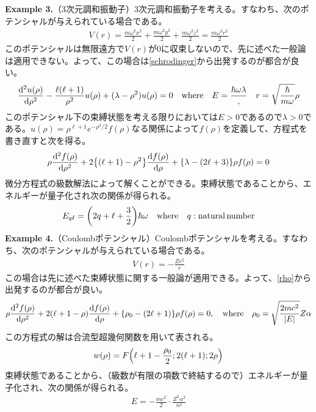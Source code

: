 \documentclass[dvipdfmx]{jarticle}
\theoremstyle{plain}
\begin{document}
\begin{enumerate}
    \textbf{Example 3.}（3次元調和振動子）3次元調和振動子を考える。すなわち、次のポテンシャルが与えられている場合である。
    \begin{align}
      V(r) = \frac{m\omega^2x^2}{2} + \frac{m\omega^2y^2}{2} + \frac{m\omega^2z^2}{2} = \frac{m\omega^2r^2}{2}
    \end{align}
    このポテンシャルは無限遠方で$V(r)$が0に収束しないので、先に述べた一般論は適用できない。よって、この場合は\eqref{schrodinger}から出発するのが都合が良い。
    \begin{align}
      \dv[2]{u(\rho)}{\rho} - \frac{\ell(\ell+1)}{\rho^2}u(\rho) + (\lambda - \rho^2)u(\rho) = 0 \quad \mathrm{where} \quad E = \frac{\hbar \omega \lambda}, \quad r = \sqrt{\frac{\hbar}{m\omega}}\rho
    \end{align}
    このポテンシャル下の束縛状態を考える限りにおいては$E > 0$であるので$\lambda > 0$である。$u(\rho) = \rho^{\ell + 1}e^{-\rho^2/2}f(\rho)$なる関係によって$f(\rho)$を定義して、方程式を書き直すと次を得る。
    \begin{align}
      \rho\dv[2]{f(\rho)}{\rho} + 2\qty{(\ell + 1) - \rho^2}\dv{f(\rho)}{\rho} + \qty{\lambda - (2\ell + 3)}\rho f(\rho) = 0
    \end{align}
    微分方程式の級数解法によって解くことができる。束縛状態であることから、エネルギーが量子化され次の関係が得られる。
    \begin{align}
      E_{q\ell} = \qty(2q + \ell + \frac{3}{2})\hbar\omega \quad \mathrm{where} \quad  q: \mathrm{natural\,number}
    \end{align}
    \textbf{Example 4.}（Coulombポテンシャル）Coulombポテンシャルを考える。すなわち、次のポテンシャルが与えられている場合である。
    \begin{align}
      V(r) = - \frac{Ze^2}{r}
    \end{align}
    この場合は先に述べた束縛状態に関する一般論が適用できる。よって、\eqref{rho}から出発するのが都合が良い。
    \begin{align}
      \rho\dv[2]{f(\rho)}{\rho} + 2\qty(\ell + 1 - \rho)\dv{f(\rho)}{\rho} + \qty{\rho_0 - (2\ell + 1)}\rho f(\rho) = 0, \quad \mathrm{where} \quad \rho_0 = \sqrt{\frac{2mc^2}{\qty|E|}}Z\alpha
    \end{align}
    この方程式の解は合流型超幾何関数を用いて表される。
    \begin{align}
      w(\rho) = F\qty(\ell + 1 - \frac{\rho_0}{2}; 2(\ell + 1); 2\rho)
    \end{align}
    束縛状態であることから、（級数が有限の項数で終結するので）エネルギーが量子化され、次の関係が得られる。
    \begin{align}
      E = -\frac{mc^2}{2} \cdot \frac{Z^2\alpha^2}{n^2}
    \end{align}


\end{enumerate}
\end{document}
